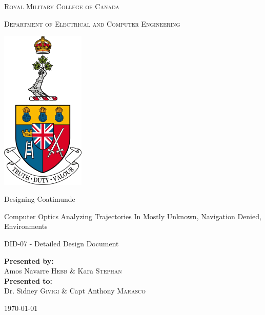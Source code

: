 \documentclass{article}[12]
\begin{document}
	
\begin{titlepage}
	\begin{center}
		\vspace*{1cm}
		
		\LARGE\textsc{Royal Military College of Canada}\normalsize
		
		\vspace{0.2cm}
		
		\textsc{Department of Electrical and Computer Engineering}
		
		\vspace{1.5cm}
		
		\includegraphics[width=0.3\textwidth]{rmcLogo.png}
		
		\vspace{1.5cm}
		
		\LARGE{Designing Coatimunde\\}
		
		\vspace{0.2cm}
		
		\normalsize{Computer Optics Analyzing Trajectories In Mostly Unknown, Navigation Denied, Environments}
		
		\vspace{0.1cm}
		
		\normalsize{DID-07 - Detailed Design Document}
		
		\vfill
		
		\textbf{Presented by:}\\Amos Navarre \textsc{Hebb} \& Kara \textsc{Stephan}\\
		\vspace{0.8cm}
		\textbf{Presented to:}\\Dr. Sidney \textsc{Givigi} \& Capt Anthony \textsc{Marasco} 
		\vspace{0.8cm}
		
		\today
		
	\end{center}
\end{titlepage}
\end{document}
